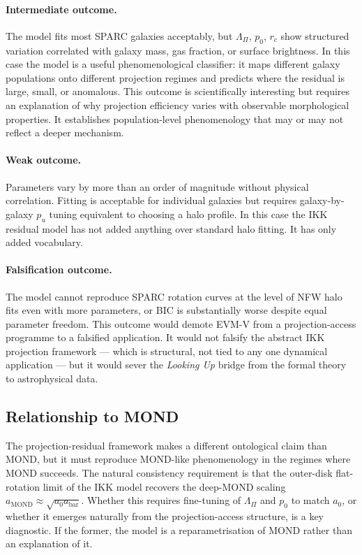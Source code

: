 \documentclass[11pt,a4paper,oneside]{article}
\newcommand{\abar}{a_{\mathrm{bar}}}
\newcommand{\aMOND}{a_{\mathrm{MOND}}}
\newcommand{\LamPi}{\Lambda_{\Pi}}
\newcommand{\pzero}{p_0}
\newcommand{\rc}{r_c}
\newcommand{\pu}{p_u}
\begin{document}
\paragraph{Intermediate outcome.}
The model fits most SPARC galaxies acceptably, but $\LamPi$, $\pzero$, $\rc$ show
structured variation correlated with galaxy mass, gas fraction, or surface brightness.
In this case the model is a useful phenomenological classifier: it maps different galaxy
populations onto different projection regimes and predicts where the residual is large,
small, or anomalous. This outcome is scientifically interesting but requires an
explanation of why projection efficiency varies with observable morphological properties.
It establishes population-level phenomenology that may or may not reflect a deeper
mechanism.

\paragraph{Weak outcome.}
Parameters vary by more than an order of magnitude without physical correlation.
Fitting is acceptable for individual galaxies but requires galaxy-by-galaxy $\pu$
tuning equivalent to choosing a halo profile. In this case the IKK residual model has
not added anything over standard halo fitting. It has only added vocabulary.

\paragraph{Falsification outcome.}
The model cannot reproduce SPARC rotation curves at the level of NFW halo fits even
with more parameters, or BIC is substantially worse despite equal parameter freedom.
This outcome would demote EVM-V from a projection-access programme to a falsified
application. It would not falsify the abstract IKK projection framework --- which is
structural, not tied to any one dynamical application --- but it would sever the
\emph{Looking Up} bridge from the formal theory to astrophysical data.

\subsection{Relationship to MOND}

The projection-residual framework makes a different ontological claim than MOND, but
it must reproduce MOND-like phenomenology in the regimes where MOND succeeds. The
natural consistency requirement is that the outer-disk flat-rotation limit of the IKK
model recovers the deep-MOND scaling $\aMOND \approx \sqrt{a_0\abar}$. Whether this
requires fine-tuning of $\LamPi$ and $\pzero$ to match $a_0$, or whether it emerges
naturally from the projection-access structure, is a key diagnostic. If the former, the
model is a reparametrisation of MOND rather than an explanation of it.
\end{document}
